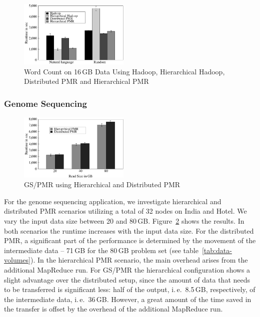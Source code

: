 \documentclass{acm_proc_article-sp}
\newcommand{\upp}{\vspace*{-0.5em}}
\begin{document}
\begin{figure}[ht]
	\centering
		\includegraphics[width=0.47\textwidth]{figures/allmrs_rands.pdf}
\caption{Word Count on 16\,GB Data Using Hadoop, Hierarchical Hadoop, Distributed PMR  and Hierarchical PMR\upp} 	
\label{fig:allmrs_rands}
\end{figure}		

\upp\upp
\subsubsection*{Genome Sequencing}

\begin{figure}[ht]
	\centering
		\includegraphics[width=0.47\textwidth]{figures/gs_hihmr_dpmr.pdf}
                \caption{GS/PMR using Hierarchical and Distributed
                  PMR\upp\upp\upp}
\label{fig:gs_hihmr_dpmr}
\end{figure}		

For the genome sequencing application, we investigate hierarchical and
distributed PMR scenarios utilizing a total of 32 nodes on India and
Hotel. We vary the input data size between 20 and 80\,GB.
Figure~\ref{fig:gs_hihmr_dpmr} shows the results. In both scenarios
the runtime increases with the input data size. For the distributed
PMR, a significant part of the performance is determined by the
movement of the intermediate data -- 71\,GB for the 80\,GB problem set
(see table~\ref{tab:data-volumes}). In the hierarchical PMR scenario,
the main overhead arises from the additional MapReduce run. For GS/PMR
the hierarchical configuration shows a slight advantage over the
distributed setup, since the amount of data that needs to be
transferred is significant less: half of the output, i.\,e.\ 8.5\,GB,
respectively, of the intermediate data, i.\,e.\ 36\,GB. However, a
great amount of the time saved in the transfer is offset by the
overhead of the additional MapReduce run.
\end{document}
